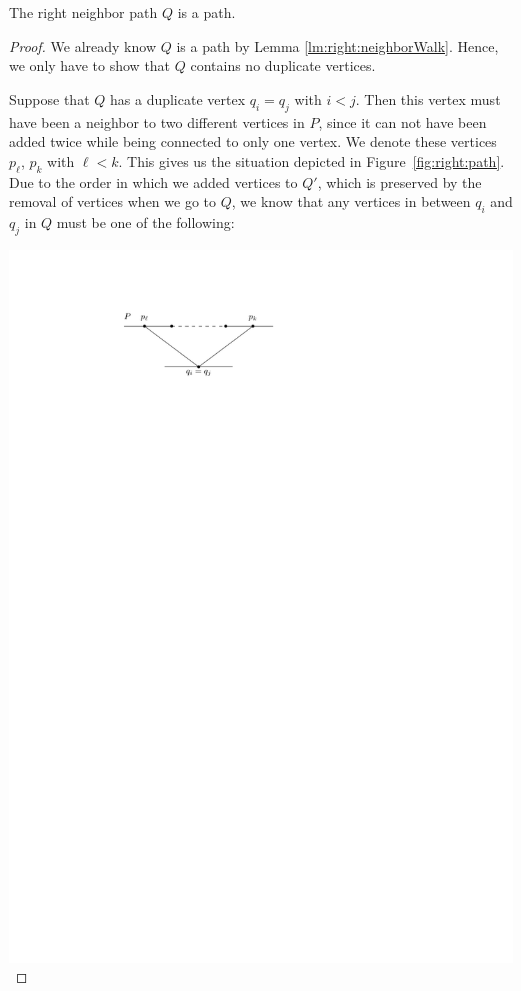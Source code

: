     \begin{lemma}
      \label{lm:right:neighborPath}
      The right neighbor path $Q$ is a path.
    \end{lemma}
    \begin{proof}
      We already know $Q$ is a path by Lemma \ref{lm:right:neighborWalk}. Hence, we only have to show that $Q$ contains no duplicate vertices.

      \vspace{2pt}
      \noindent
      \begin{minipage}[c]{0.5\linewidth}
      \setlength{\parindent}{15pt}
      Suppose that $Q$ has a duplicate vertex $q_i=q_j$ with $i<j$.
      Then this vertex must have been a neighbor to two different vertices in $P$, since it can not have been added twice while being connected to only one vertex.
      We denote these vertices $p_\ell$, $p_k$ with $\ell<k$.
      This gives us the situation depicted in Figure~\ref{fig:right:path}.
      Due to the order in which we added vertices to $Q'$, which is preserved by the removal of vertices when we go to $Q$, we know that any vertices in between $q_i$ and $q_j$ in $Q$ must be one of the following:
      \end{minipage}
      \hfill
      \begin{minipage}[c]{0.5\linewidth}
        \centering
        \includegraphics[scale=1]{unifiedAlgo/img/rightNeighbourwalk/neighborPathisPath.pdf}
        \label{fig:right:path}
      \end{minipage}


\end{proof}
